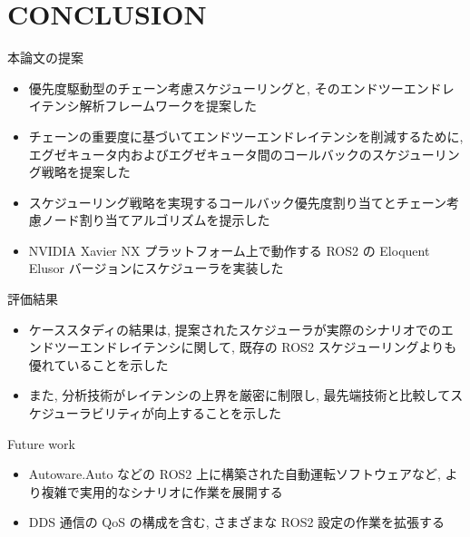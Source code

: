 
\section{CONCLUSION}
\label{sec: conslusion}

\begin{frame}{本論文の提案}
    \begin{itemize}
        \item 優先度駆動型のチェーン考慮スケジューリングと, そのエンドツーエンドレイテンシ解析フレームワークを提案した
        \item チェーンの重要度に基づいてエンドツーエンドレイテンシを削減するために, エグゼキュータ内およびエグゼキュータ間のコールバックのスケジューリング戦略を提案した
        \item スケジューリング戦略を実現するコールバック優先度割り当てとチェーン考慮ノード割り当てアルゴリズムを提示した
        \item NVIDIA Xavier NX プラットフォーム上で動作する ROS2 の Eloquent Elusor バージョンにスケジューラを実装した
    \end{itemize}
\end{frame}

\begin{frame}{評価結果}
    \begin{itemize}
        \item ケーススタディの結果は, 提案されたスケジューラが実際のシナリオでのエンドツーエンドレイテンシに関して, 既存の ROS2 スケジューリングよりも優れていることを示した
        \item また, 分析技術がレイテンシの上界を厳密に制限し, 最先端技術と比較してスケジューラビリティが向上することを示した
    \end{itemize}
\end{frame}

\begin{frame}{Future work}
    \begin{itemize}
        \item Autoware.Auto などの ROS2 上に構築された自動運転ソフトウェアなど, より複雑で実用的なシナリオに作業を展開する
        \item DDS 通信の QoS の構成を含む, さまざまな ROS2 設定の作業を拡張する
    \end{itemize}
\end{frame}

